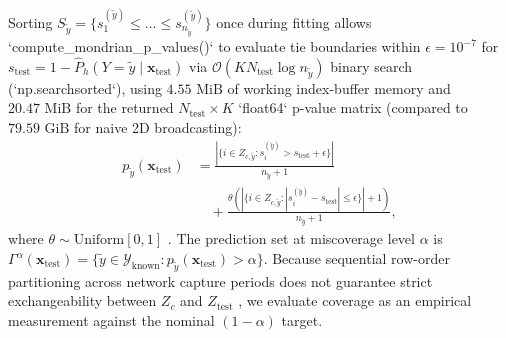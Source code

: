 ﻿\documentclass[conference]{IEEEtran}
\begin{document}
Sorting $S_{\tilde{y}} = \{s_1^{(\tilde{y})} \le \dots \le s_{n_{\tilde{y}}}^{(\tilde{y})}\}$ once during fitting allows `compute_mondrian_p_values()` to evaluate tie boundaries within $\epsilon = 10^{-7}$ for $s_{\text{test}} = 1 - \hat{P}_h(Y = \tilde{y} \mid \mathbf{x}_{\text{test}})$ via $\mathcal{O}(K N_{\text{test}} \log n_{\tilde{y}})$ binary search (`np.searchsorted`), using $4.55\text{ MiB}$ of working index-buffer memory and $20.47\text{ MiB}$ for the returned $N_{\text{test}} \times K$ `float64` p-value matrix (compared to $79.59\text{ GiB}$ for naive 2D broadcasting):
\begin{align}
p_{\tilde{y}}(\mathbf{x}_{\text{test}}) &= \frac{\left|\{i \in Z_{c,\tilde{y}} : s_i^{(\tilde{y})} > s_{\text{test}} + \epsilon\}\right|}{n_{\tilde{y}} + 1} \nonumber \\
&\quad + \frac{\theta \left(\left|\{i \in Z_{c,\tilde{y}} : |s_i^{(\tilde{y})} - s_{\text{test}}| \le \epsilon\}\right| + 1\right)}{n_{\tilde{y}} + 1},
\label{eq:mondrian_pval}
\end{align}
where $\theta \sim \text{Uniform}[0, 1]$ \cite{b16}. The prediction set at miscoverage level $\alpha$ is $\Gamma^\alpha(\mathbf{x}_{\text{test}}) = \{\tilde{y} \in \mathcal{Y}_{\text{known}} : p_{\tilde{y}}(\mathbf{x}_{\text{test}}) > \alpha\}$. Because sequential row-order partitioning across network capture periods does not guarantee strict exchangeability between $Z_c$ and $Z_{\text{test}}$ \cite{b19,b20}, we evaluate coverage as an empirical measurement against the nominal $(1-\alpha)$ target.
\end{document}
